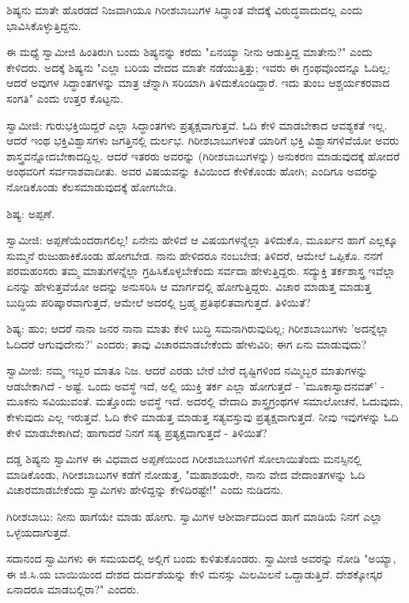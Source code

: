 ಶಿಷ್ಯನು ಮಾತೇ ಹೊರಡದೆ ನಿಜವಾಗಿಯೂ ಗಿರೀಶಬಾಬುಗಳ ಸಿದ್ಧಾಂತ ವೇದಕ್ಕೆ ವಿರುದ್ಧವಾದುದಲ್ಲ ಎಂದು ಭಾವಿಸಿಕೊಳ್ಳುತ್ತಿದ್ದನು.

ಈ ಮಧ್ಯೆ ಸ್ವಾಮೀಜಿ ಹಿಂತಿರುಗಿ ಬಂದು ಶಿಷ್ಯನನ್ನು ಕರೆದು "ಏನಯ್ಯಾ ನೀನು ಆಡುತ್ತಿದ್ದ ಮಾತೇನು?" ಎಂದು ಕೇಳಿದರು. ಅದಕ್ಕೆ ಶಿಷ್ಯನು "ಎಲ್ಲಾ ಬರಿಯ ವೇದದ ಮಾತೇ ನಡೆಯುತ್ತಿತ್ತು; ಇವರು ಈ ಗ್ರಂಥವೊಂದನ್ನೂ ಓದಿಲ್ಲ; ಆದರೆ ಅವುಗಳ ಸಿದ್ಧಾಂತಗಳನ್ನು ಮಾತ್ರ ಚೆನ್ನಾಗಿ ಸರಿಯಾಗಿ ತಿಳಿದುಕೊಂಡಿದ್ದಾರೆ. ಇದು ತುಂಬ ಆಶ್ಚರ್ಯಕರವಾದ ಸಂಗತಿ" ಎಂದು ಉತ್ತರ ಕೊಟ್ಟನು.

ಸ್ವಾಮೀಜಿ: ಗುರುಭಕ್ತಿಯಿದ್ದರೆ ಎಲ್ಲಾ ಸಿದ್ಧಾಂತಗಳು ಪ್ರತ್ಯಕ್ಷವಾಗುತ್ತವೆ. ಓದಿ ಕೇಳಿ ಮಾಡಬೇಕಾದ ಆವಶ್ಯಕತೆ ಇಲ್ಲ. ಆದರೆ ಇಂಥ ಭಕ್ತಿವಿಶ್ವಾಸಗಳು ಜಗತ್ತಿನಲ್ಲಿ ದುರ್ಲಭ. ಗಿರೀಶಬಾಬುಗಳಂತೆ ಯಾರಿಗೆ ಭಕ್ತಿ ವಿಶ್ವಾಸಗಳಿವೆಯೋ ಅವರು ಶಾಸ್ತ್ರವನ್ನೋದಬೇಕಾದದ್ದಿಲ್ಲ. ಆದರೆ ಇತರರು ಅವರನ್ನು (ಗಿರೀಶಬಾಬುಗಳನ್ನು) ಅನುಕರಣ ಮಾಡುವುದಕ್ಕೆ ಹೋದರೆ ಅಂಥವರಿಗೆ ಸರ್ವನಾಶವಾದೀತು. ಅವರ ವಿಷಯವನ್ನು ಕಿವಿಯಿಂದ ಕೇಳಿಕೊಂಡು ಹೋಗಿ; ಎಂದಿಗೂ ಅವರನ್ನು ನೋಡಿಕೊಂಡು ಕೆಲಸಮಾಡುವುದಕ್ಕೆ ಹೋಗಬೇಡಿ.

ಶಿಷ್ಯ: ಅಪ್ಪಣೆ.

ಸ್ವಾಮೀಜಿ: ಅಪ್ಪಣೆಯೆಂದರಾಗಲಿಲ್ಲ! ಏನೇನು ಹೇಳಿದೆ ಆ ವಿಷಯಗಳನ್ನೆಲ್ಲಾ ತಿಳಿದುಕೊ, ಮೂರ್ಖನ ಹಾಗೆ ಎಲ್ಲಕ್ಕೂ ಸುಮ್ಮನೆ ರುಜುಹಾಕಿಕೊಂಡು ಹೋಗಬೇಡ. ನಾನು ಹೇಳಿದರೂ ನಂಬಬೇಡ; ತಿಳಿದರೆ, ಆಮೇಲೆ ಒಪ್ಪಿಕೊ. ನನಗೆ ಪರಮಹಂಸರು ತಮ್ಮ ಮಾತುಗಳನ್ನೆಲ್ಲಾ ಗ್ರಹಿಸಿಕೊಳ್ಳಬೇಕೆಂದು ಸರ್ವದಾ ಹೇಳುತ್ತಿದ್ದರು. ಸದ್ಯುಕ್ತಿ ತರ್ಕಶಾಸ್ತ್ರ ಇವೆಲ್ಲಾ ಏನನ್ನು ಹೇಳುತ್ತವೆಯೋ ಅದನ್ನು ಅನುಸರಿಸಿ ಆ ಮಾರ್ಗದಲ್ಲಿ ಹೋಗುತ್ತಿದ್ದರು. ವಿಚಾರ ಮಾಡುತ್ತ ಮಾಡುತ್ತ ಬುದ್ಧಿಯ ಪರಿಷ್ಕಾರವಾಗುತ್ತದೆ, ಆಮೇಲೆ ಅದರಲ್ಲಿ ಬ್ರಹ್ಮ ಪ್ರತಿಫಲಿತವಾಗುತ್ತದೆ. ತಿಳಿಯಿತೆ?

ಶಿಷ್ಯ: ಹುಂ; ಆದರೆ ನಾನಾ ಜನರ ನಾನಾ ಮಾತು ಕೇಳಿ ಬುದ್ಧಿ ಸಮನಾಗಿರುವುದಿಲ್ಲ; ಗಿರೀಶಬಾಬುಗಳು 'ಅದನ್ನೆಲ್ಲಾ ಓದಿದರೆ ಆಗುವುದೇನು?' ಎಂದರು; ತಾವು ವಿಚಾರಮಾಡಬೇಕೆಂದು ಹೇಳುವಿರಿ; ಈಗ ಏನು ಮಾಡುವುದು?

ಸ್ವಾಮೀಜಿ: ನಮ್ಮ ಇಬ್ಬರ ಮಾತೂ ನಿಜ. ಆದರೆ ಎರಡು ಬೇರೆ ಬೇರೆ ದೃಷ್ಟಿಗಳಿಂದ ನಮ್ಮಿಬ್ಬರ ಮಾತುಗಳನ್ನು ಆಡಬೇಕಾಗಿದೆ - ಅಷ್ಟೆ. ಒಂದು ಅವಸ್ಥೆ ಇದೆ, ಅಲ್ಲಿ ಯುಕ್ತಿ ತರ್ಕ ಎಲ್ಲಾ ಹೋಗುತ್ತದೆ - 'ಮೂಕಾಸ್ವಾದನವತ್' - ಮೂಕನು ಸವಿಯುವಂತೆ. ಮತ್ತೊಂದು ಅವಸ್ಥೆ ಇದೆ. ಅದರಲ್ಲಿ ವೇದಾದಿ ಶಾಸ್ತ್ರಗ್ರಂಥಗಳ ಸಮಾಲೋಚನೆ, ಓದುವುದು, ಕೇಳುವುದು ಎಲ್ಲ ಇರುತ್ತವೆ. ಓದಿ ಕೇಳಿ ಮಾಡುತ್ತ ಮಾಡುತ್ತ ಸತ್ಯವಸ್ತುವು ಪ್ರತ್ಯಕ್ಷವಾಗುತ್ತದೆ. ನೀವು ಇವುಗಳನ್ನು ಓದಿ ಕೇಳಿ ಮಾಡಬೇಕಾಗಿದೆ; ಹಾಗಾದರೆ ನಿನಗೆ ಸತ್ಯ ಪ್ರತ್ಯಕ್ಷವಾಗುತ್ತದೆ - ತಿಳಿಯಿತೆ?

ದಡ್ಡ ಶಿಷ್ಯನು ಸ್ವಾಮಿಗಳ ಈ ವಿಧವಾದ ಅಪ್ಪಣೆಯಿಂದ ಗಿರೀಶಬಾಬುಗಳಿಗೆ ಸೋಲಾಯಿತೆಂದು ಮನಸ್ಸಿನಲ್ಲಿ ಮಾಡಿಕೊಂಡು, ಗಿರೀಶಬಾಬುಗಳ ಕಡೆಗೆ ನೋಡುತ್ತ, "ಮಹಾಶಯರೇ, ನಾನು ವೇದ ವೇದಾಂತಗಳನ್ನು ಓದಿ ವಿಚಾರಮಾಡಬೇಕೆಂದು ಸ್ವಾಮಿಗಳು ಹೇಳಿದ್ದನ್ನು ಕೇಳಿದಿರಷ್ಟೇ!" ಎಂದು ನುಡಿದನು.

ಗಿರೀಶಬಾಬು: ನೀನು ಹಾಗೆಯೇ ಮಾಡು ಹೋಗು. ಸ್ವಾಮಿಗಳ ಆಶೀರ್ವಾದದಿಂದ ಹಾಗೆ ಮಾಡಿಯೆ ನಿನಗೆ ಎಲ್ಲಾ ಒಳ್ಳೆಯದಾಗುತ್ತದೆ.

ಸದಾನಂದ ಸ್ವಾಮಿಗಳು ಈ ಸಮಯದಲ್ಲಿ ಅಲ್ಲಿಗೆ ಬಂದು ಕುಳಿತುಕೊಂಡರು. ಸ್ವಾಮೀಜಿ ಅವರನ್ನು ನೋಡಿ "ಅಯ್ಯಾ, ಈ ಜಿ.ಸಿ.ಯ ಬಾಯಿಯಿಂದ ದೇಶದ ದುರ್ದಶೆಯನ್ನು ಕೇಳಿ ಮನಸ್ಸು ಮಿಲಮಿಲನೆ ಒದ್ದಾಡುತ್ತಿದೆ. ದೇಶಕ್ಕೋಸ್ಕರ ಏನಾದರೂ ಮಾಡಬಲ್ಲಿರಾ?" ಎಂದರು.

